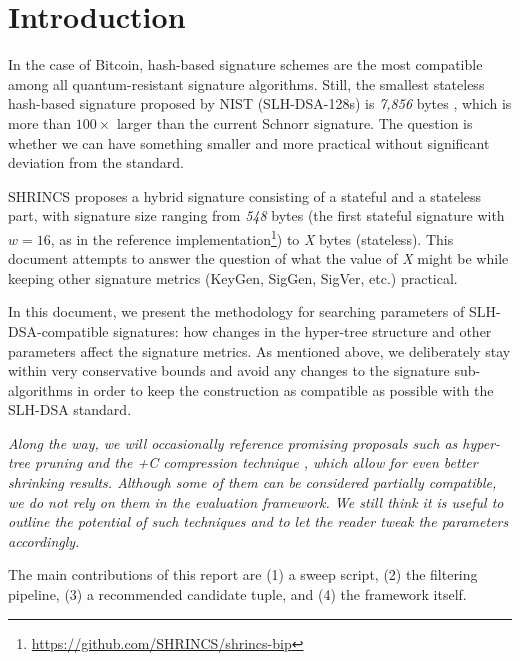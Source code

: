 \section{Introduction} \label{sec:introduction}
In the case of Bitcoin, hash-based signature schemes are the most compatible among all quantum-resistant signature algorithms. Still, the smallest stateless hash-based signature proposed by NIST (SLH-DSA-128s) is \emph{7,856} bytes \cite{nist}, which is more than $100\times$ larger than the current Schnorr signature. The question is whether we can have something smaller and more practical without significant deviation from the standard.

SHRINCS \cite{delving-post} proposes a hybrid signature consisting of a stateful and a stateless part, with signature size ranging from \emph{548} bytes (the first stateful signature with $w = 16$, as in the reference implementation\footnote{\url{https://github.com/SHRINCS/shrincs-bip}}) to \emph{X} bytes (stateless). This document attempts to answer the question of what the value of \emph{X} might be while keeping other signature metrics (KeyGen, SigGen, SigVer, etc.) practical.

In this document, we present the methodology for searching parameters of SLH-DSA-compatible signatures: how changes in the hyper-tree structure and other parameters affect the signature metrics. As mentioned above, we deliberately stay within very conservative bounds and avoid any changes to the signature sub-algorithms in order to keep the construction as compatible as possible with the SLH-DSA standard.

\textit{Along the way, we will occasionally reference promising proposals such as hyper-tree pruning \cite{conduition-blog} and the +C compression technique \cite{mike-paper}, which allow for even better shrinking results. Although some of them can be considered partially compatible, we do not rely on them in the evaluation framework. We still think it is useful to outline the potential of such techniques and to let the reader tweak the parameters accordingly.}

The main contributions of this report are (1) a sweep script, (2) the filtering pipeline, (3) a recommended candidate tuple, and (4) the framework itself.